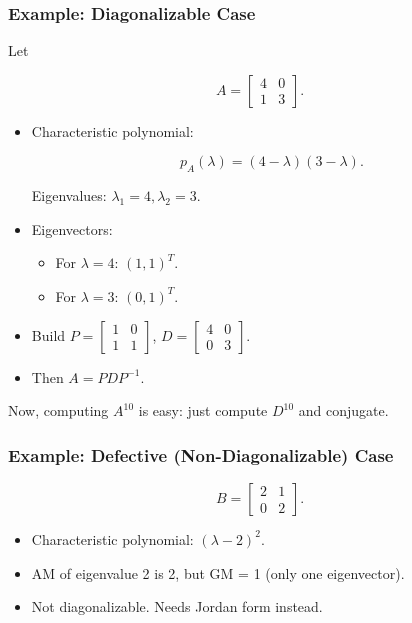 \documentclass[
  letterpaper,
  DIV=11,
  numbers=noendperiod]{scrreprt}
\providecommand{\tightlist}{%
  \setlength{\itemsep}{0pt}\setlength{\parskip}{0pt}}
\begin{document}
\subsubsection{Example: Diagonalizable
Case}\label{example-diagonalizable-case}

Let

\[
A = \begin{bmatrix} 4 & 0 \\ 1 & 3 \end{bmatrix}.
\]

\begin{itemize}
\item
  Characteristic polynomial:

  \[
  p_A(\lambda) = (4-\lambda)(3-\lambda).
  \]

  Eigenvalues: \(\lambda_1=4, \lambda_2=3\).
\item
  Eigenvectors:

  \begin{itemize}
  \tightlist
  \item
    For \(\lambda=4\): \((1,1)^T\).
  \item
    For \(\lambda=3\): \((0,1)^T\).
  \end{itemize}
\item
  Build \(P = \begin{bmatrix} 1 & 0 \\ 1 & 1 \end{bmatrix}\),
  \(D = \begin{bmatrix} 4 & 0 \\ 0 & 3 \end{bmatrix}\).
\item
  Then \(A = P D P^{-1}\).
\end{itemize}

Now, computing \(A^{10}\) is easy: just compute \(D^{10}\) and
conjugate.

\subsubsection{Example: Defective (Non-Diagonalizable)
Case}\label{example-defective-non-diagonalizable-case}

\[
B = \begin{bmatrix} 2 & 1 \\ 0 & 2 \end{bmatrix}.
\]

\begin{itemize}
\tightlist
\item
  Characteristic polynomial: \((\lambda - 2)^2\).
\item
  AM of eigenvalue 2 is 2, but GM = 1 (only one eigenvector).
\item
  Not diagonalizable. Needs Jordan form instead.
\end{itemize}
\end{document}
